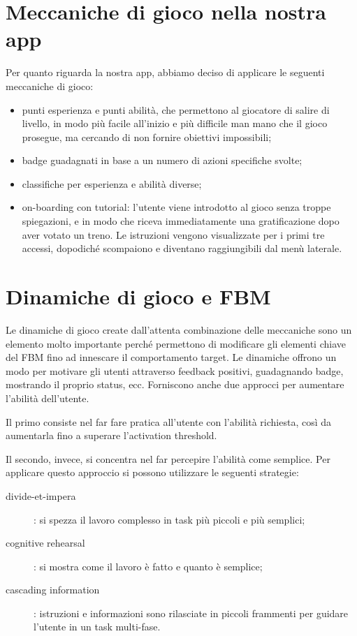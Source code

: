 \section{Meccaniche di gioco nella nostra app\label{sec:meccaniche-app}}
Per quanto riguarda la nostra app, abbiamo deciso di applicare le seguenti meccaniche di gioco:
\begin{itemize}
    \item punti esperienza e punti abilità, che permettono al giocatore di salire di livello, in modo più facile all'inizio e più difficile man mano che il gioco prosegue, ma cercando di non fornire obiettivi impossibili;
    \item badge guadagnati in base a un numero di azioni specifiche svolte;
    \item classifiche per esperienza e abilità diverse;
    \item on-boarding con tutorial: l'utente viene introdotto al gioco senza troppe spiegazioni, e in modo che riceva immediatamente una gratificazione dopo aver votato un treno. Le istruzioni vengono visualizzate per i primi tre accessi, dopodiché scompaiono e diventano raggiungibili dal menù laterale.
\end{itemize}

\section{Dinamiche di gioco e FBM\label{sec:dinamiche-fbm}}

Le dinamiche di gioco create dall'attenta combinazione delle meccaniche sono un elemento molto importante perché permettono di modificare gli elementi chiave del FBM fino ad innescare il comportamento target.
Le dinamiche offrono un modo per motivare gli utenti attraverso feedback positivi, guadagnando badge, mostrando il proprio status, ecc. Forniscono anche due approcci per aumentare l'abilità dell'utente.

Il primo consiste nel far fare pratica all'utente con l'abilità richiesta, così da aumentarla fino a superare l'activation threshold.

Il secondo, invece, si concentra nel far percepire l'abilità come semplice. Per applicare questo  approccio si possono utilizzare le seguenti strategie:
\begin{description}
    \item[divide-et-impera]: si spezza il lavoro complesso in task più piccoli e più semplici;
    \item[cognitive rehearsal]: si mostra come il lavoro è fatto e quanto è semplice;
    \item[cascading information]: istruzioni e informazioni sono rilasciate in piccoli frammenti per guidare l'utente in un task multi-fase.
\end{description}

